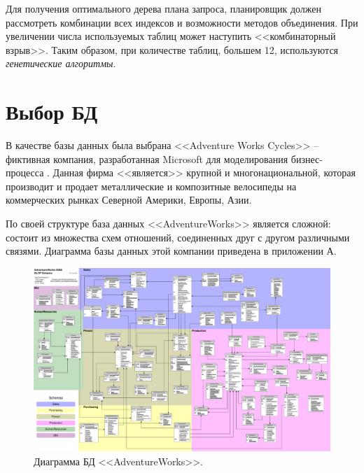 Для получения оптимального дерева плана запроса, планировщик должен рассмотреть комбинации всех индексов и возможности методов объединения. При увеличении числа используемых таблиц может наступить <<комбинаторный взрыв>>. Таким образом, при количестве таблиц, большем 12, используются \textit{генетические алгоритмы}.

\section{Выбор БД}
В качестве базы данных была выбрана <<Adventure Works Cycles>> -- фиктивная компания, разработанная Microsoft для моделирования бизнес-процесса \cite{adventureworks}. Данная фирма <<является>> крупной и многонациональной, которая производит и продает металлические и композитные велосипеды на коммерческих рынках Северной Америки, Европы, Азии.

По своей структуре база данных <<AdventureWorks>> является сложной: состоит из множества схем отношений, соединенных друг с другом различными связями. Диаграмма базы данных этой компании приведена в приложении А.
\begin{figure}[H]
	\centering
	{
		\includegraphics[scale=0.27, angle=90]{./images/adventure_works_db_diagram.pdf}
		\caption{Диаграмма БД <<AdventureWorks>>.}
		\label{image:db_diagram_adventureworks}
	}
\end{figure}